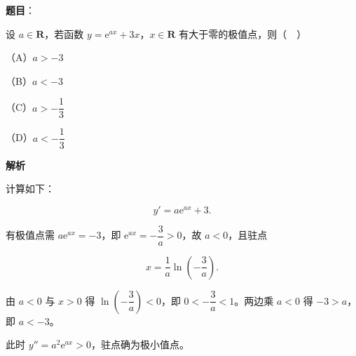 \begin{answer}

\textbf{题目}：

设 $a\in\mathbf R$，若函数 $y=\mathrm e^{ax}+3x$，$x\in\mathbf R$ 有大于零的极值点，则（　）

（A）$a>-3$

（B）$a<-3$

（C）$a>-\dfrac13$

（D）$a<-\dfrac13$

\textbf{解析}

计算如下：

\nopagebreak[4]
\[y'=a\mathrm e^{ax}+3.\]

有极值点需 $a\mathrm e^{ax}=-3$，即 $\mathrm e^{ax}=-\dfrac3a>0$，故 $a<0$，且驻点

\nopagebreak[4]
\[x=\frac1a\ln\left(-\frac3a\right).\]

由 $a<0$ 与 $x>0$ 得 $\ln\left(-\dfrac3a\right)<0$，即 $0<-\dfrac3a<1$。两边乘 $a<0$ 得 $-3>a$，即 $a<-3$。

此时 $y''=a^2\mathrm e^{ax}>0$，驻点确为极小值点。


\end{answer}
